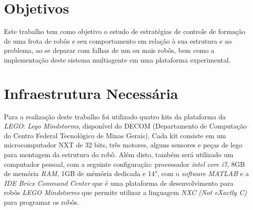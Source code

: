 \section{Objetivos}
\label{sec:objetivos}

Este trabalho tem como objetivo o estudo de estratégias de controle de formação de uma frota de robôs e seu comportamento em relação à sua estrutura e ao problema, ao se deparar com falhas de um ou mais robôs, bem como a implementação deste sistema multiagente em uma plataforma experimental.%

\section{Infraestrutura Necessária}
\label{sec:infra}


Para a realização deste trabalho foi utilizado quatro kits da plataforma da \emph{LEGO}: \emph{Lego Mindstorms}, disponível do DECOM (Departamento de Computação do Centro Federal Tecnológico de Minas Gerais). Cada kit consiste em um microcomputador NXT de 32 bits, três motores, alguns sensores e peças de lego para montagem da estrutura do robô. Além disto, também será utilizado  um computador pessoal, com a seguinte configuração: processador \emph{intel core i7}, 8GB de memória \emph{RAM}, 1GB de mémória dedicada e 14", com o \emph{software MATLAB} e a \emph{IDE Bricx Command Center} \cite{sorceforge2001} que é uma plataforma de desenvolvimento para robôs \emph{LEGO Mindstorms} que permite utilizar a linguagem \emph{NXC (Not eXactly C)} para programar os robôs.